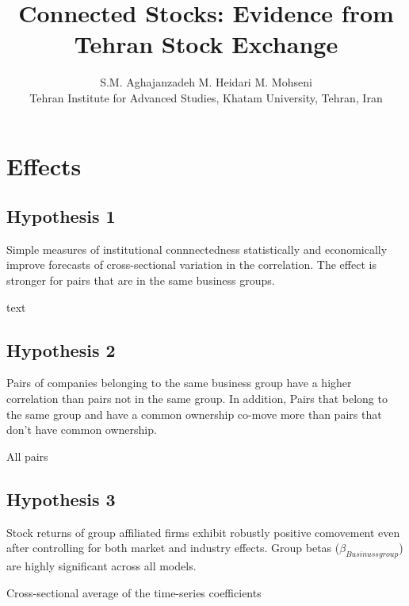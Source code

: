 \documentclass[12pt, a4paper]{article}
\title{Connected Stocks: Evidence from Tehran Stock Exchange}
\author{S.M. Aghajanzadeh\sym{*} \qquad M. Heidari\sym{*} \qquad M. Mohseni\sym{*} \\
	\sym{*} \footnotesize  Tehran Institute for Advanced Studies, Khatam University, Tehran, Iran
}
\begin{document}
	\maketitle
\section*{Effects}
\subsection*{\textbf{Hypothesis 1}}
 Simple measures of institutional connnectedness statistically and economically improve forecasts of cross-sectional variation in the correlation. The effect is stronger for pairs that are in the same business groups.

		\begin{table}[htbp]
	\centering
	\caption{text}
	\resizebox{\textwidth}{!}{
		
	}
\end{table}

	\FloatBarrier
	\newpage
	
\subsection*{\textbf{Hypothesis 2}}
 Pairs of companies belonging to the same business group have a higher correlation than pairs not in the same group. In addition, Pairs that belong to the same group and have a common ownership co-move more than pairs that don't have common ownership. 
		\begin{table}[htbp]
	\centering
	\caption{All pairs}
%		
\resizebox{\textwidth}{!}{
	
}
\end{table}

\newpage
\subsection*{\textbf{Hypothesis 3}} 
Stock returns of group affiliated firms exhibit robustly positive comovement even after controlling for both market and industry effects. Group betas
($ \beta_{Businussgroup} $) are highly significant across all models.

			\begin{table}[htbp]
		\centering
		\caption{Cross-sectional average of the time-series coefficients}
		\resizebox{\textwidth}{!}{
			
		}
	\end{table}
\end{document}
